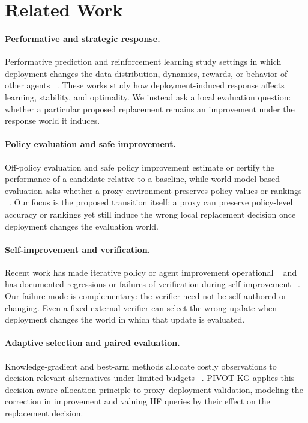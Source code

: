 \documentclass{article}
\begin{document}
\section{Related Work}

\paragraph{Performative and strategic response.}
Performative prediction and reinforcement learning study settings in which
deployment changes the data distribution, dynamics, rewards, or behavior of
other agents
~\citep{perdomo2020performative,mandal2023performative,rank2024performative,
mandal2025linear,gois2025performative,multiagentperformative2022}.
These works study how deployment-induced response affects learning, stability,
and optimality. We instead ask a local evaluation question: whether a
particular proposed replacement remains an improvement under the response
world it induces.

\paragraph{Policy evaluation and safe improvement.}
Off-policy evaluation and safe policy improvement estimate or certify the
performance of a candidate relative to a baseline, while world-model-based
evaluation asks whether a proxy environment preserves policy values or
rankings
~\citep{jiang2016doubly,thomas2015hcpi,worldgym2025,policyaware2026}.
Our focus is the proposed transition itself: a proxy can preserve policy-level
accuracy or rankings yet still induce the wrong local replacement decision
once deployment changes the evaluation world.

\paragraph{Self-improvement and verification.}
Recent work has made iterative policy or agent improvement operational
~\citep{evopolicygym2026,dgm2025} and has documented regressions or failures of
verification during self-improvement
~\citep{wu2024progress,selfauthored2026}.
Our failure mode is complementary: the verifier need not be self-authored or
changing. Even a fixed external verifier can select the wrong update when
deployment changes the world in which that update is evaluated.

\paragraph{Adaptive selection and paired evaluation.}
Knowledge-gradient and best-arm methods allocate costly observations to
decision-relevant alternatives under limited budgets
~\citep{frazier2009kg,kalyanakrishnan2012pac,xie2016pairwise}.
PIVOT-KG applies this decision-aware allocation principle to
proxy--deployment validation, modeling the correction in improvement and
valuing HF queries by their effect on the replacement decision.
\end{document}
